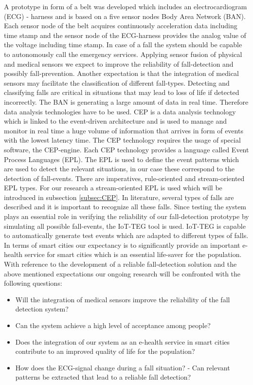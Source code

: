 \documentclass[review]{elsarticle}
\begin{document}
A prototype in form of a belt was developed which includes an electrocardiogram (ECG) - harness and is based on a five sensor nodes Body Area Network (BAN). Each sensor node of the belt acquires continuously acceleration data including time stamp and the sensor node of the ECG-harness provides the analog value of the voltage including time stamp. In case of a fall the system should be capable to autonomously call the emergency services. Applying sensor fusion of physical and medical sensors we expect to improve the reliability of fall-detection and possibly fall-prevention. Another expectation is that the integration of medical sensors may facilitate the classification of different fall-types. Detecting and classifying falls are critical in situations that may lead to loss of life if detected incorrectly. The BAN is generating a large amount of data in real time. Therefore data analysis technologies have to be used. CEP \cite{Esper:2016} is a data analysis technology which is linked to the event-driven architecture and is used to manage and monitor in real time a huge volume of information that arrives in form of events with the lowest latency time. The CEP technology requires the usage of special software, the CEP-engine. Each CEP technology provides a language called Event Process Languages (EPL). The EPL is used to define the event patterns which are used to detect the relevant situations, in our case these correspond to the detection of fall-events. There are imperatives, rule-oriented and stream-oriented EPL types. For our research a stream-oriented EPL is used which will be introduced in subsection \ref{subsec:CEP}.  In literature, several types of falls are described and it is important to recognize all these falls. Since testing the system plays an essential role in verifying the reliability of our fall-detection prototype by simulating all possible fall-events, the IoT-TEG tool \cite{Gutierrez2017,TesisGutierrez2017} is used. IoT-TEG \cite{Gutierrez2017,TesisGutierrez2017} is capable to automatically generate test events which are adapted to different types of falls.
In terms of smart cities our expectancy is to significantly provide an important e-health service for smart cities which is an essential life-saver for the population. With reference to the development of a reliable fall-detection solution and the above mentioned expectations our ongoing research will be confronted with the following questions:
\begin{itemize}
	\item Will the integration of medical sensors improve the reliability of the fall detection system?
	\item Can the system achieve a high level of acceptance among people?
	\item Does the integration of our system as an e-health service in smart cities contribute to an improved quality of life for the population?
	\item How does the ECG-signal change during a fall situation? - Can relevant patterns be extracted that lead to a reliable fall detection?
	
\end{itemize}
\end{document}
